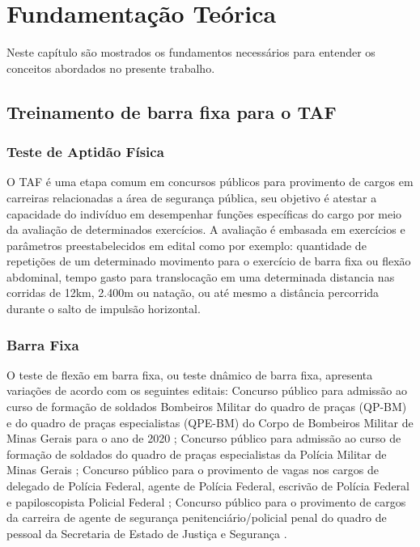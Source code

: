 \chapter{Fundamentação Teórica}
Neste capítulo são mostrados os fundamentos necessários para entender os conceitos abordados no presente trabalho.


\section[Treinamento de barra fixa para o TAF]{Treinamento de barra fixa para o TAF}\label{sec:Treinamento de barra fixa para o TAF}

\subsection[Teste de Aptidão Física]{Teste de Aptidão Física}\label{sec:Teste de Aptidão Física}

O \ac{TAF}  é uma etapa comum em concursos públicos para provimento de cargos em carreiras relacionadas a área de segurança pública, seu objetivo é atestar a capacidade do indivíduo em desempenhar funções específicas do cargo por meio da avaliação de determinados exercícios. A avaliação é embasada em exercícios e parâmetros preestabelecidos em edital como por exemplo: quantidade de repetições de um determinado movimento para o exercício de barra fixa ou flexão abdominal, tempo gasto para translocação em uma determinada distancia nas corridas de 12km, 2.400m ou natação, ou até mesmo a distância percorrida durante o salto de impulsão horizontal\cite{TAF_adv}.


\subsection[Barra Fixa]{Barra Fixa}\label{sec:Barra Fixa}

O teste de flexão em barra fixa, ou teste dnâmico de barra fixa, apresenta variações de acordo com os seguintes editais: Concurso público para admissão ao curso de formação de soldados Bombeiros Militar do quadro de praças (QP-BM) e do quadro de praças especialistas (QPE-BM) do Corpo de Bombeiros Militar de Minas Gerais para o ano de 2020 \cite{eCBMG2018}; Concurso público para admissão ao curso de formação de soldados do quadro de praças especialistas da Polícia Militar de Minas Gerais \cite{ePMMG2021}; Concurso público para o provimento de vagas nos cargos de delegado de Polícia Federal, agente de Polícia Federal, escrivão de Polícia Federal e papiloscopista Policial Federal \cite{ePF2021}; Concurso público para o provimento de cargos da carreira de agente de segurança penitenciário/policial penal do quadro de pessoal da Secretaria de Estado de Justiça e Segurança \cite{ePP2021}.

